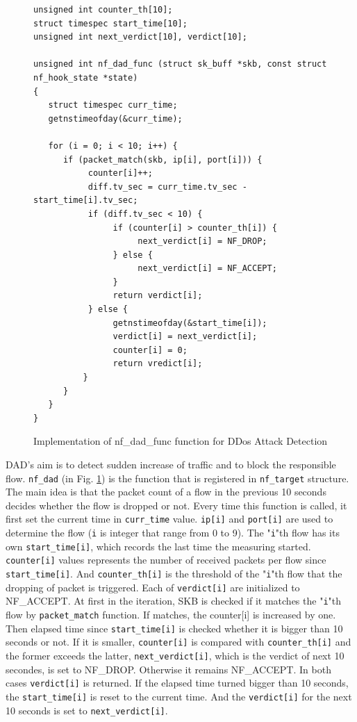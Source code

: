 \begin{figure}
	\begin{center}
		\begin{screen}
			\begin{verbatim}
unsigned int counter_th[10];
struct timespec start_time[10];
unsigned int next_verdict[10], verdict[10];

unsigned int nf_dad_func (struct sk_buff *skb, const struct nf_hook_state *state) 
{
   struct timespec curr_time;
   getnstimeofday(&curr_time);

   for (i = 0; i < 10; i++) {
      if (packet_match(skb, ip[i], port[i])) {
           counter[i]++;
           diff.tv_sec = curr_time.tv_sec - start_time[i].tv_sec;
           if (diff.tv_sec < 10) {
                if (counter[i] > counter_th[i]) {
                     next_verdict[i] = NF_DROP;
                } else {
                     next_verdict[i] = NF_ACCEPT;
                }
                return verdict[i];
           } else {
                getnstimeofday(&start_time[i]);
                verdict[i] = next_verdict[i];
                counter[i] = 0;
                return vredict[i];
          }
      }
   }
}
			\end{verbatim}	
		\end{screen}
	\end{center}
	\caption{Implementation of nf\_dad\_func function for DDos Attack Detection}
	\label{fig: nf_dad_func}
\end{figure}

DAD's aim is to detect sudden increase of traffic and to block the responsible flow. {\tt nf\_dad} (in Fig. \ref{fig: nf_dad_func}) is the function that is registered in {\tt nf\_target} structure. The main idea is that the packet count of a flow in the previous 10 seconds decides whether the flow is dropped or not. 
Every time this function is called, it first set the current time in {\tt curr\_time} value. {\tt ip[i]} and {\tt port[i]} are used to determine the flow ({\tt i} is integer that range from 0 to 9). The "{\tt i}"th flow has its own {\tt start\_time[i]}, which records the last time the measuring started. {\tt counter[i]} values represents the number of received packets per flow since {\tt start\_time[i]}. And {\tt counter\_th[i]} is the threshold of the "{\tt i}"th flow that the dropping of packet is triggered. Each of {\tt verdict[i]} are initialized to NF\_ACCEPT. At first in the iteration, SKB is checked if it matches the "{\tt i}"th flow by {\tt packet\_match} function. If matches, the counter[i] is increased by one. Then elapsed time since {\tt start\_time[i]} is checked whether it is bigger than 10 seconds or not. If it is smaller, {\tt counter[i]} is compared with {\tt counter\_th[i]} and the former exceeds the latter, {\tt next\_verdict[i]}, which is the verdict of next 10 secondes, is set to NF\_DROP. Otherwise it remains NF\_ACCEPT. In both cases {\tt verdict[i]} is returned. If the elapsed time turned bigger than 10 seconds, the {\tt start\_time[i]} is reset to the current time. And the {\tt verdict[i]} for the next 10 seconds is set to {\tt next\_verdict[i]}. 

